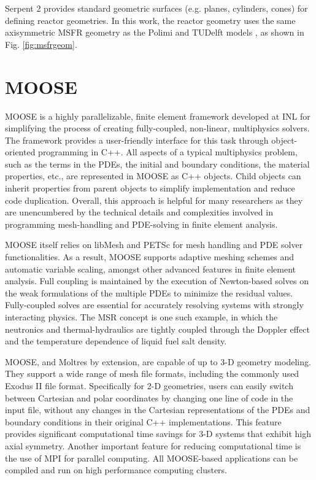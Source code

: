 Serpent 2 provides standard geometric surfaces (e.g. planes, cylinders, cones)
for defining reactor geometries. In this work, the reactor geometry uses the
same axisymmetric \gls{MSFR} geometry as the Polimi and TUDelft models
\cite{fiorina_modelling_2014}, as shown in Fig. \ref{fig:msfrgeom}.

\section{MOOSE}

\gls{MOOSE} \cite{gaston_physics-based_2015} is a highly parallelizable,
finite element framework developed at \gls{INL} for simplifying the process of
creating fully-coupled, non-linear, multiphysics solvers. The framework
provides a user-friendly interface for this task through object-oriented
programming in C++. All aspects of a typical multiphysics problem, such as the
terms in the \glspl{PDE}, the initial and boundary conditions, the material
properties, etc., are represented in \gls{MOOSE} as C++ objects. Child objects
can inherit properties from parent objects to simplify implementation and
reduce code duplication. Overall, this approach
is helpful for many researchers as they are unencumbered by the
technical details and complexities involved in programming mesh-handling
and \gls{PDE}-solving in finite element analysis.

\gls{MOOSE} itself relies on libMesh \cite{kirk_libmesh:_2006} and
PETSc \cite{satish_petsc_2019} for mesh handling and \gls{PDE} solver
functionalities. As a result, \gls{MOOSE} supports adaptive meshing schemes
and automatic variable scaling, amongst other advanced features in finite
element analysis. Full
coupling is maintained by the execution of Newton-based solves on the
weak formulations of the multiple \glspl{PDE} to minimize the residual values.
Fully-coupled solves are essential for accurately resolving systems with
strongly interacting physics. The \gls{MSR} concept is one such example, in
which the neutronics and thermal-hydraulics are tightly coupled through the
Doppler effect and the temperature dependence of liquid fuel salt density.

\gls{MOOSE}, and Moltres by extension, are capable of up to 3-D geometry
modeling. They support a wide range of mesh file formats, including the
commonly used Exodus II file format. Specifically for 2-D geometries, users
can easily switch between Cartesian and polar coordinates by changing one line
of code in the input file, without any changes in
the Cartesian representations of the \glspl{PDE} and boundary conditions in
their original C++ implementations. This feature provides significant
computational time savings for 3-D systems that exhibit high axial symmetry.
Another important feature for reducing computational time is the use of MPI
for parallel computing. All \gls{MOOSE}-based applications can be compiled and
run on high performance computing clusters.

